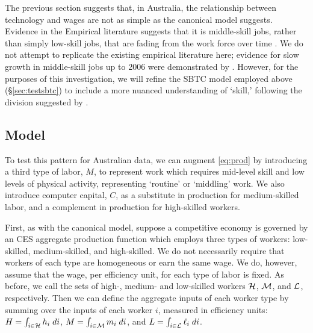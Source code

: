 The previous section suggests that, in Australia, the relationship between technology and wages are not as simple as the canonical model suggests. Evidence in the Empirical literature suggests that it is middle-skill jobs, rather than simply low-skill jobs, that are fading from the work force over time \citep[][e.g.]{Harding1997,Cully1999,Esposto2012}. We do not attempt to replicate the existing empirical literature here; evidence for slow growth in middle-skill jobs up to 2006 were demonstrated by \citep{Esposto2012}. However, for the purposes of this investigation, we will refine the SBTC model employed above (\S\ref{sec:testsbtc}) to include a more nuanced understanding of `skill,' following the division suggested by \citet{Levy2003}.

\subsection{Model}

To test this pattern for Australian data, we can augment \eqref{eq:prod} by introducing a third type of labor, $M$, to represent work which requires mid-level skill and low levels of physical activity, representing `routine' or `middling' work. We also introduce computer capital, $C$, as a substitute in production for medium-skilled labor, and a complement in production for high-skilled workers.

First, as with the canonical model, suppose a competitive economy is governed by an CES aggregate production function which employs three types of workers: low-skilled, medium-skilled, and high-skilled. We do not necessarily require that workers of each type are homogeneous or earn the same wage. We do, however, assume that the wage, per efficiency unit, for each type of labor is fixed. As before, we call the sets of high-, medium- and low-skilled workers $\mathcal{H}$, $\mathcal{M}$, and $\mathcal{L}$, respectively. Then we can define the aggregate inputs of each worker type by summing over the inputs of each worker $i$, measured in efficiency units: ${H = \int_{i\in\mathcal{H}}h_i\;di}$, ${M = \int_{i\in\mathcal{M}}m_i\;di}$, and ${L = \int_{i\in\mathcal{L}}\ell_i\;di}$.

